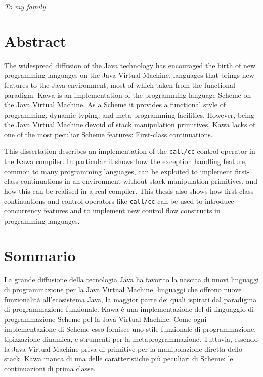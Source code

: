 \documentclass[12pt,a4paper,oneside,openright]{book}
\begin{document}
\begin{flushright}
\textit{To my family}
\end{flushright}

\newpage

\frontmatter
\chapter{Abstract}

The widespread diffusion of the Java technology has encouraged the birth
of new programming languages on the Java Virtual Machine, languages that
brings new features to the Java environment, most of which taken from
the functional paradigm. Kawa is an implementation of the programming
language Scheme on the Java Virtual Machine. As a Scheme it provides a
functional style of programming, dynamic typing, and meta-programming
facilities. However, being the Java Virtual Machine devoid of stack
manipulation primitives, Kawa lacks of one of the most peculiar Scheme
features: First-class continuations.

This dissertation describes an implementation of the \texttt{call/cc}
control operator in the Kawa compiler. In particular it shows how the
exception handling feature, common to many programming languages, can be
exploited to implement first-class continuations in an environment
without stack manipulation primitives, and how this can be realised in a
real compiler. This thesis also shows how first-class continuations and
control operators like \texttt{call/cc} can be used to introduce
concurrency features and to implement new control flow constructs in
programming languages.

\chapter{Sommario}

La grande diffusione della tecnologia Java ha favorito la nascita di
nuovi linguaggi di programmazione per la Java Virtual Machine, linguaggi
che offrono nuove funzionalità all'ecosistema Java, la maggior parte dei
quali ispirati dal paradigma di programmazione funzionale. Kawa è una
implementazione del di linguaggio di programmazione Scheme pel la Java
Virtual Machine. Come ogni implementazione di Scheme esso fornisce uno
stile funzionale di programmazione, tipizzazione dinamica, e strumenti
per la metaprogrammazione. Tuttavia, essendo la Java Virtual Machine
priva di primitive per la manipolazione diretta dello stack, Kawa manca
di una delle caratteristiche più peculiari di Scheme: le continuazioni
di prima classe.
\end{document}
